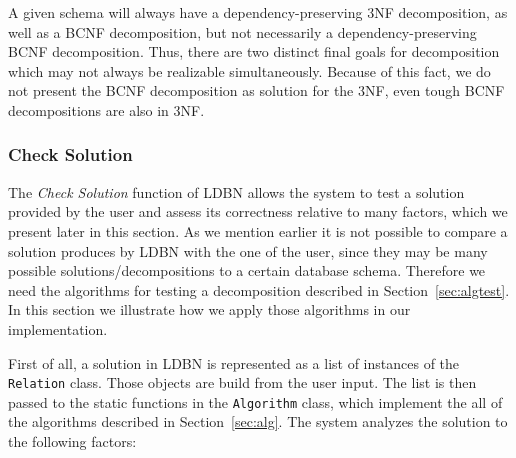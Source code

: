 A given schema will always have a dependency-preserving 3NF
decomposition, as well as a BCNF decomposition, but not necessarily a
dependency-preserving BCNF decomposition. Thus, there are two
distinct final goals for decomposition which may not always be
realizable simultaneously. Because of this fact, we do not present the BCNF decomposition as solution
for the 3NF, even tough BCNF decompositions are also in 3NF.

\subsubsection{Check Solution}  
The \textit{Check Solution} function of LDBN allows the system to test a solution 
provided by the user and assess its correctness relative to many factors, which
we present later in this section. As we mention earlier it is not possible
to compare a solution produces by LDBN with the one of the user, since they may be many
possible solutions/decompositions to a certain database schema. Therefore we need the
algorithms for testing a decomposition described in Section~\ref{sec:algtest}. In this section
we illustrate how we apply those algorithms in our implementation. 

First of all, a solution in LDBN is represented as a list of instances of the
\verb=Relation= class. Those objects are build from the user input. The list is then
passed to the static functions in the \verb=Algorithm= class, which 
implement the all of the algorithms described in Section~\ref{sec:alg}. 
The system analyzes the solution to the following factors:

